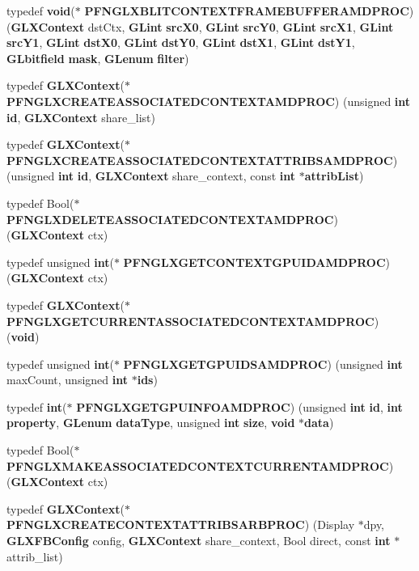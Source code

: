 \begin{DoxyCompactItemize}
\item 
typedef {\bf void}($\ast$ {\bf P\+F\+N\+G\+L\+X\+B\+L\+I\+T\+C\+O\+N\+T\+E\+X\+T\+F\+R\+A\+M\+E\+B\+U\+F\+F\+E\+R\+A\+M\+D\+P\+R\+OC}) ({\bf G\+L\+X\+Context} dst\+Ctx, {\bf G\+Lint} {\bf src\+X0}, {\bf G\+Lint} {\bf src\+Y0}, {\bf G\+Lint} {\bf src\+X1}, {\bf G\+Lint} {\bf src\+Y1}, {\bf G\+Lint} {\bf dst\+X0}, {\bf G\+Lint} {\bf dst\+Y0}, {\bf G\+Lint} {\bf dst\+X1}, {\bf G\+Lint} {\bf dst\+Y1}, {\bf G\+Lbitfield} {\bf mask}, {\bf G\+Lenum} {\bf filter})
\item 
typedef {\bf G\+L\+X\+Context}($\ast$ {\bf P\+F\+N\+G\+L\+X\+C\+R\+E\+A\+T\+E\+A\+S\+S\+O\+C\+I\+A\+T\+E\+D\+C\+O\+N\+T\+E\+X\+T\+A\+M\+D\+P\+R\+OC}) (unsigned {\bf int} {\bf id}, {\bf G\+L\+X\+Context} share\+\_\+list)
\item 
typedef {\bf G\+L\+X\+Context}($\ast$ {\bf P\+F\+N\+G\+L\+X\+C\+R\+E\+A\+T\+E\+A\+S\+S\+O\+C\+I\+A\+T\+E\+D\+C\+O\+N\+T\+E\+X\+T\+A\+T\+T\+R\+I\+B\+S\+A\+M\+D\+P\+R\+OC}) (unsigned {\bf int} {\bf id}, {\bf G\+L\+X\+Context} share\+\_\+context, const {\bf int} $\ast${\bf attrib\+List})
\item 
typedef Bool($\ast$ {\bf P\+F\+N\+G\+L\+X\+D\+E\+L\+E\+T\+E\+A\+S\+S\+O\+C\+I\+A\+T\+E\+D\+C\+O\+N\+T\+E\+X\+T\+A\+M\+D\+P\+R\+OC}) ({\bf G\+L\+X\+Context} ctx)
\item 
typedef unsigned {\bf int}($\ast$ {\bf P\+F\+N\+G\+L\+X\+G\+E\+T\+C\+O\+N\+T\+E\+X\+T\+G\+P\+U\+I\+D\+A\+M\+D\+P\+R\+OC}) ({\bf G\+L\+X\+Context} ctx)
\item 
typedef {\bf G\+L\+X\+Context}($\ast$ {\bf P\+F\+N\+G\+L\+X\+G\+E\+T\+C\+U\+R\+R\+E\+N\+T\+A\+S\+S\+O\+C\+I\+A\+T\+E\+D\+C\+O\+N\+T\+E\+X\+T\+A\+M\+D\+P\+R\+OC}) ({\bf void})
\item 
typedef unsigned {\bf int}($\ast$ {\bf P\+F\+N\+G\+L\+X\+G\+E\+T\+G\+P\+U\+I\+D\+S\+A\+M\+D\+P\+R\+OC}) (unsigned {\bf int} max\+Count, unsigned {\bf int} $\ast${\bf ids})
\item 
typedef {\bf int}($\ast$ {\bf P\+F\+N\+G\+L\+X\+G\+E\+T\+G\+P\+U\+I\+N\+F\+O\+A\+M\+D\+P\+R\+OC}) (unsigned {\bf int} {\bf id}, {\bf int} {\bf property}, {\bf G\+Lenum} {\bf data\+Type}, unsigned {\bf int} {\bf size}, {\bf void} $\ast${\bf data})
\item 
typedef Bool($\ast$ {\bf P\+F\+N\+G\+L\+X\+M\+A\+K\+E\+A\+S\+S\+O\+C\+I\+A\+T\+E\+D\+C\+O\+N\+T\+E\+X\+T\+C\+U\+R\+R\+E\+N\+T\+A\+M\+D\+P\+R\+OC}) ({\bf G\+L\+X\+Context} ctx)
\item 
typedef {\bf G\+L\+X\+Context}($\ast$ {\bf P\+F\+N\+G\+L\+X\+C\+R\+E\+A\+T\+E\+C\+O\+N\+T\+E\+X\+T\+A\+T\+T\+R\+I\+B\+S\+A\+R\+B\+P\+R\+OC}) (Display $\ast$dpy, {\bf G\+L\+X\+F\+B\+Config} config, {\bf G\+L\+X\+Context} share\+\_\+context, Bool direct, const {\bf int} $\ast$attrib\+\_\+list)

\end{DoxyCompactItemize}
